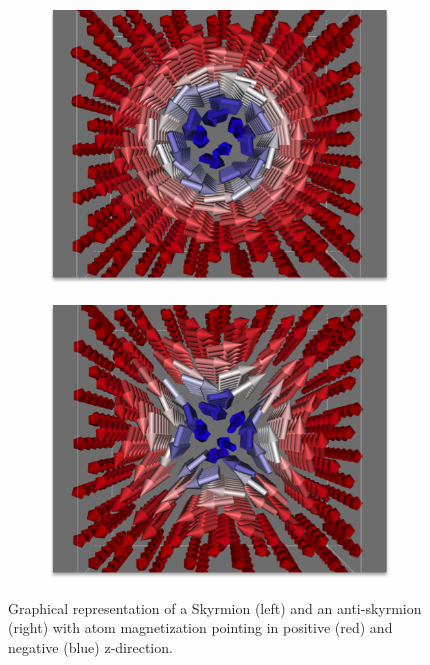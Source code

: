 \documentclass [a4paper, 12pt]{article}
\begin{document}
\begin{figure}
	\centering
	\begin{subfigure}{.5\textwidth}
		  \centering
		  \includegraphics[width=.99\linewidth]{Figures/MnGe_skyrmion.png}
		  \label{fig:sub1}
	\end{subfigure}%
	\begin{subfigure}{.5\textwidth}
		  \centering
		  \includegraphics[width=.99\linewidth]{Figures/MnGe_antiskyrmion.png}
                  \label{fig:sub2}
	\end{subfigure}
	\caption{Graphical representation of a Skyrmion (left) and an anti-skyrmion (right) 
	with atom magnetization pointing in positive (red) and negative (blue) z-direction.}
	\label{fig:test}
\end{figure}
\end{document}
